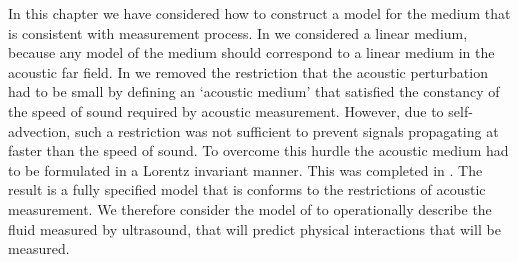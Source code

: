 In this chapter we have considered how to construct a model for the medium that is consistent with measurement process.
In  we considered a linear medium, because any model of the medium should correspond to a linear medium in the acoustic far field.
In  we removed the restriction that the acoustic perturbation had to be small
by defining an `acoustic medium' that satisfied the constancy of the speed of sound required by acoustic measurement.
However, due to self-advection, such a restriction was not sufficient to prevent signals propagating at faster than the speed of sound.
To overcome this hurdle the acoustic medium had to be formulated in a Lorentz invariant manner.  
This was completed in .
The result is a fully specified model that is conforms to the restrictions of acoustic measurement.
We therefore consider the model of  to operationally describe the fluid measured by ultrasound,
that will predict physical interactions that will be measured.








